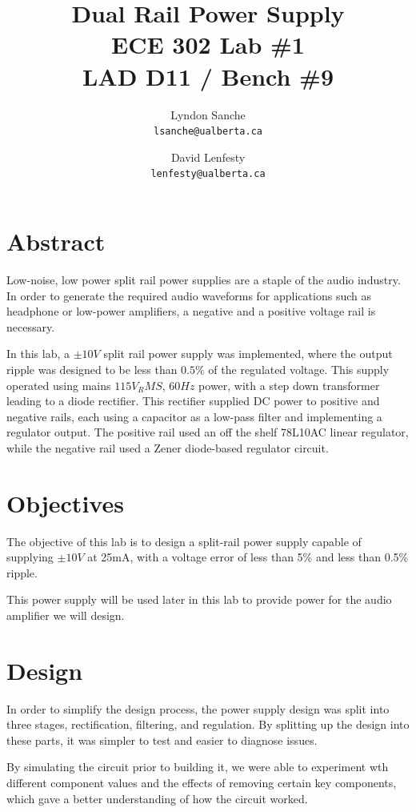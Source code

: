 \documentclass[12pt]{article}
\title{ {\Huge Dual Rail Power Supply } \\
    ECE 302 Lab \#1 \\ LAD D11 / Bench \#9}
\author{
    Lyndon Sanche\\
    \texttt{lsanche@ualberta.ca}
    \and
    David Lenfesty\\
    \texttt{lenfesty@ualberta.ca}
}
\begin{document}

\maketitle


\section{Abstract}

Low-noise, low power split rail power supplies are a staple of the audio industry.
In order to generate the required audio waveforms for applications such as headphone or
low-power amplifiers, a negative and a positive voltage rail is necessary.

In this lab, a $\pm 10 V$ split rail power supply was implemented,
where the output ripple was designed to be less than $ 0.5 \% $ of the
regulated voltage. This supply operated using mains $115 V_RMS$, $60Hz $ power, with
a step down transformer leading to a diode rectifier. This rectifier supplied DC power to
positive and negative rails, each using a capacitor as a low-pass filter and implementing
a regulator output. The positive rail used an off the shelf 78L10AC linear regulator,
while the negative rail used a Zener diode-based regulator circuit.

\newpage
{}

\section{Objectives}

The objective of this lab is to design a split-rail power supply capable of supplying
$\pm 10V$ at 25mA, with a voltage error of less than 5\% and less than 0.5\% ripple.

This power supply will be used later in this lab to provide power for the audio amplifier
we will design.

\section{Design}

In order to simplify the design process, the power supply design was split into three
stages, rectification, filtering, and regulation. By splitting up the design into these
parts, it was simpler to test and easier to diagnose issues.

By simulating the circuit prior to building it, we were able to experiment wth different
component values and the effects of removing certain key components, which gave a better
understanding of how the circuit worked.
\end{document}
